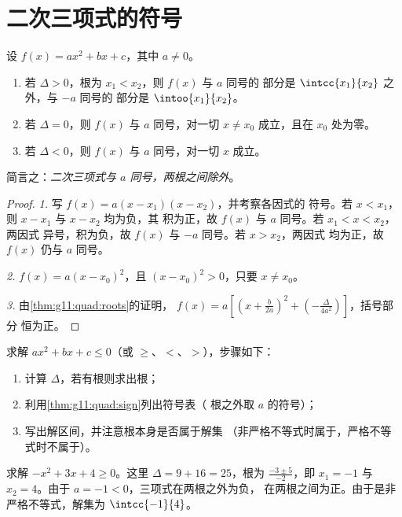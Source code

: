 \section{二次三项式的符号}

\begin{theorem}[二次三项式的符号]\label{thm:g11:quad:sign}
设 $f(x) = ax^2+bx+c$，其中 $a \neq 0$。
\begin{enumerate}
  \item 若 $\Delta > 0$，根为 $x_1 < x_2$，则 $f(x)$ 与 $a$ 同号的
        部分是 $\intcc{x_1}{x_2}$ 之外，与 $-a$ 同号的
        部分是 $\intoo{x_1}{x_2}$。
  \item 若 $\Delta = 0$，则 $f(x)$ 与 $a$ 同号，对一切 $x \neq x_0$
        成立，且在 $x_0$ 处为零。
  \item 若 $\Delta < 0$，则 $f(x)$ 与 $a$ 同号，对一切 $x$ 成立。
\end{enumerate}
简言之：\emph{二次三项式与 $a$ 同号，两根之间除外}。
\end{theorem}

\begin{proof}
\emph{1.} 写 $f(x) = a(x-x_1)(x-x_2)$，并考察各因式的
符号。若 $x < x_1$，则 $x - x_1$ 与 $x - x_2$ 均为负，其
积为正，故 $f(x)$ 与 $a$ 同号。若 $x_1 < x < x_2$，两因式
异号，积为负，故 $f(x)$ 与 $-a$ 同号。若 $x > x_2$，两因式
均为正，故 $f(x)$ 仍与
$a$ 同号。

\emph{2.} $f(x) = a(x - x_0)^2$，且 $(x-x_0)^2 > 0$，只要 $x \neq x_0$。

\emph{3.} 由\cref{thm:g11:quad:roots}的证明，
$f(x) = a\left[\left(x + \frac{b}{2a}\right)^2 +
\left(-\frac{\Delta}{4a^2}\right)\right]$，括号部分
恒为正。
\end{proof}

\begin{method}[解二次不等式]\label{met:g11:quad:inequalities}
求解 $ax^2 + bx + c \leq 0$（或 $\geq$、$<$、$>$），步骤如下：
\begin{enumerate}
  \item 计算 $\Delta$，若有根则求出根；
  \item 利用\cref{thm:g11:quad:sign}列出符号表（
        根之外取 $a$ 的符号）；
  \item 写出解区间，并注意根本身是否属于解集
        （非严格不等式时属于，严格不等式时不属于）。
\end{enumerate}
\end{method}

\begin{example}\label{ex:g11:quad:inequality}
求解 $-x^2 + 3x + 4 \geq 0$。这里 $\Delta = 9 + 16 = 25$，根为
$\frac{-3 \pm 5}{-2}$，即 $x_1 = -1$ 与 $x_2 = 4$。由于
$a = -1 < 0$，三项式在两根之外为负，
在两根之间为正。由于是非严格不等式，解集为
$\intcc{-1}{4}$。
\end{example}

